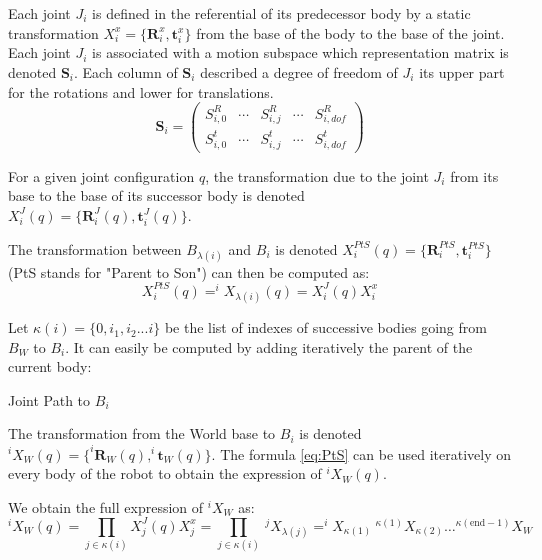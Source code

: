Each joint $J_i$ is defined in the referential of its predecessor body by a static transformation $X^x_i = \{\mathbf{R}^x_i, \mathbf{t}^x_i\}$ from the base of the body to the base of the joint.
Each joint $J_i$ is associated with a motion subspace which representation matrix is denoted $\mathbf{S}_i$. Each column of $\mathbf{S}_i$ described a degree of freedom of $J_i$ its upper part for the rotations and lower for translations.
\begin{equation}
  \mathbf{S}_i =
  \begin{pmatrix}
    S^R_{i,0} & \cdots &
    S^R_{i,j} & \cdots &
    S^R_{i,dof} \\
    S^t_{i,0} & \cdots &
    S^t_{i,j} & \cdots &
    S^t_{i,dof}
  \end{pmatrix}
\end{equation}

For a given joint configuration $q$, the transformation due to the joint $J_i$ from its base to the base of its successor body is denoted \\$X^J_i(q) = \{\mathbf{R}^J_i(q), \mathbf{t}^J_i(q)\}$.

The transformation between $B_{\lambda(i)}$ and $B_i$ is denoted $X^{PtS}_i(q) = \{\mathbf{R}^{PtS}_i, \mathbf{t}^{PtS}_i\}$ (PtS stands for "Parent to Son") can then be computed as:
\begin{equation}
  X^{PtS}_i(q) = ^iX_{\lambda(i)}(q) = X^J_i(q) X^x_i
  \label{eq:PtS}
\end{equation}

Let $\kappa(i) =\{0, i_1, i_2 ... i\}$ be the list of indexes of successive bodies going from $B_W$ to $B_i$.
It can easily be computed by adding iteratively the parent of the current body:

\begin{algorithm}
  \caption{Joint Path to $B_i$}
  \label{JP}
\begin{algorithmic}
  \EndWhile
\end{algorithmic}
\end{algorithm}

The transformation from the World base to $B_i$ is denoted \\ $^iX_W(q) = \{^i\mathbf{R}_W(q), ^i\mathbf{t}_W(q)\}$.
The formula \ref{eq:PtS} can be used iteratively on every body of the robot to obtain the expression of $^iX_W(q)$.

We obtain the full expression of $^iX_W$ as:
\begin{equation}
  ^iX_W(q) = \prod_{j\in\kappa(i)}X^J_j(q) X^x_j = \prod_{j\in\kappa(i)}\ ^jX_{\lambda(j)}
  = ^iX_{\kappa(1)}\ ^{\kappa(1)}X_{\kappa(2)} \dots ^{\kappa(\text{end}-1)}X_{W}
\end{equation}

